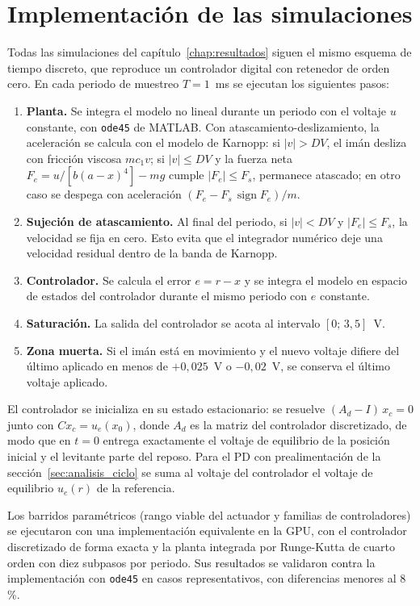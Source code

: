 \chapter{Implementación de las simulaciones}\label{ap:simulacion}

Todas las simulaciones del capítulo~\ref{chap:resultados} siguen el mismo esquema de tiempo discreto, que reproduce un controlador digital con retenedor de orden cero. En cada periodo de muestreo $T=1$~ms se ejecutan los siguientes pasos:

\begin{enumerate}
  \item \textbf{Planta.} Se integra el modelo no lineal durante un periodo con el voltaje $u$ constante, con \texttt{ode45} de MATLAB. Con atascamiento-deslizamiento, la aceleración se calcula con el modelo de Karnopp: si $|v|>DV$, el imán desliza con fricción viscosa $m c_1 v$; si $|v|\le DV$ y la fuerza neta $F_e=u/[b(a-x)^4]-mg$ cumple $|F_e|\le F_s$, permanece atascado; en otro caso se despega con aceleración $(F_e - F_s\,\operatorname{sign}F_e)/m$.
  \item \textbf{Sujeción de atascamiento.} Al final del periodo, si $|v|<DV$ y $|F_e|\le F_s$, la velocidad se fija en cero. Esto evita que el integrador numérico deje una velocidad residual dentro de la banda de Karnopp.
  \item \textbf{Controlador.} Se calcula el error $e=r-x$ y se integra el modelo en espacio de estados del controlador durante el mismo periodo con $e$ constante.
  \item \textbf{Saturación.} La salida del controlador se acota al intervalo $[0;\,3{,}5]$~V.
  \item \textbf{Zona muerta.} Si el imán está en movimiento y el nuevo voltaje difiere del último aplicado en menos de $+0{,}025$~V o $-0{,}02$~V, se conserva el último voltaje aplicado.
\end{enumerate}

El controlador se inicializa en su estado estacionario: se resuelve $(A_d - I)\,x_c = 0$ junto con $C x_c = u_e(x_0)$, donde $A_d$ es la matriz del controlador discretizado, de modo que en $t=0$ entrega exactamente el voltaje de equilibrio de la posición inicial y el levitante parte del reposo. Para el PD con prealimentación de la sección~\ref{sec:analisis_ciclo} se suma al voltaje del controlador el voltaje de equilibrio $u_e(r)$ de la referencia.

Los barridos paramétricos (rango viable del actuador y familias de controladores) se ejecutaron con una implementación equivalente en la GPU, con el controlador discretizado de forma exacta y la planta integrada por Runge-Kutta de cuarto orden con diez subpasos por periodo. Sus resultados se validaron contra la implementación con \texttt{ode45} en casos representativos, con diferencias menores al 8\,\%.

